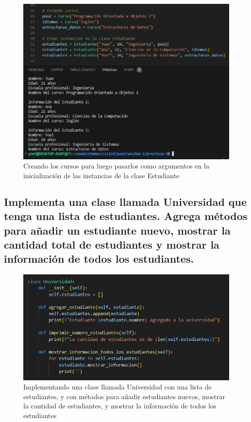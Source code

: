 \documentclass[11pt,a4paper]{article}
\begin{document}
\begin{figure}[H]
    \centering
    \includegraphics[width=1\linewidth]{images/5.png}
    \caption{Creando los cursos para luego pasarlos como argumentos en la inicialización de las instancias de la clase Estudiante}
    \label{fig:enter-label}
\end{figure}

\subsection{Implementa una clase llamada Universidad que tenga una lista de estudiantes. Agrega métodos para añadir un estudiante nuevo, mostrar la cantidad total de estudiantes y mostrar la información de todos los estudiantes.}

\begin{figure}[H]
    \centering
    \includegraphics[width=0.8\linewidth]{images/6.png}
    \caption{Implementando una clase llamada Universidad con una lista de estudiantes, y con métodos para añadir estudiantes nuevos, mostrar la cantidad de estudiantes, y mostrar la información de todos los estudiantes}
    \label{fig:enter-label}
\end{figure}
\end{document}
